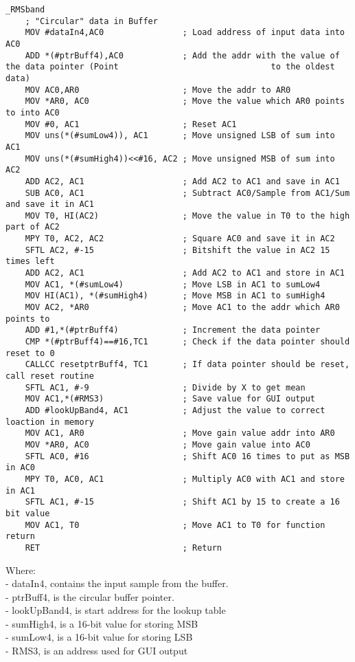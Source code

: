 \begin{lstlisting}[language={[x86masm]Assembler}, caption = {limiter Algorithm},label={listingCompressorMain}]
_RMSband
	; "Circular" data in Buffer
	MOV #dataIn4,AC0				; Load address of input data into AC0
	ADD *(#ptrBuff4),AC0			; Add the addr with the value of the data pointer (Point 					 	       to the oldest data)
	MOV AC0,AR0						; Move the addr to AR0
	MOV *AR0, AC0					; Move the value which AR0 points to into AC0
	MOV #0, AC1						; Reset AC1
	MOV uns(*(#sumLow4)), AC1       ; Move unsigned LSB of sum into AC1
	MOV uns(*(#sumHigh4))<<#16, AC2 ; Move unsigned MSB of sum into AC2
	ADD AC2, AC1					; Add AC2 to AC1 and save in AC1
	SUB AC0, AC1					; Subtract AC0/Sample from AC1/Sum and save it in AC1	 
	MOV T0, HI(AC2)					; Move the value in T0 to the high part of AC2
	MPY T0, AC2, AC2				; Square AC0 and save it in AC2
	SFTL AC2, #-15					; Bitshift the value in AC2 15 times left 
	ADD AC2, AC1					; Add AC2 to AC1 and store in AC1
	MOV AC1, *(#sumLow4)			; Move LSB in AC1 to sumLow4
	MOV HI(AC1), *(#sumHigh4)		; Move MSB in AC1 to sumHigh4
	MOV AC2, *AR0					; Move AC1 to the addr which AR0 points to
	ADD #1,*(#ptrBuff4)				; Increment the data pointer
	CMP *(#ptrBuff4)==#16,TC1		; Check if the data pointer should reset to 0
	CALLCC resetptrBuff4, TC1		; If data pointer should be reset, call reset routine
	SFTL AC1, #-9					; Divide by X to get mean
	MOV AC1,*(#RMS3)				; Save value for GUI output
	ADD #lookUpBand4, AC1			; Adjust the value to correct loaction in memory
	MOV AC1, AR0					; Move gain value addr into AR0
	MOV *AR0, AC0					; Move gain value into AC0
	SFTL AC0, #16					; Shift AC0 16 times to put as MSB in AC0
	MPY T0, AC0, AC1				; Multiply AC0 with AC1 and store in AC1 
	SFTL AC1, #-15					; Shift AC1 by 15 to create a 16 bit value
	MOV AC1, T0						; Move AC1 to T0 for function return
	RET								; Return
\end{lstlisting}

Where: \\
- dataIn4, contains the input sample from the buffer. \\
- ptrBuff4, is the circular buffer pointer. \\
- lookUpBand4, is start address for the lookup table\\
- sumHigh4, is a 16-bit value for storing MSB \\
- sumLow4, is a 16-bit value for storing LSB \\
- RMS3, is an address used for GUI output \\

